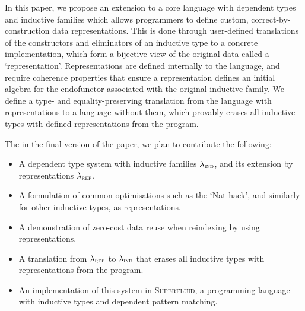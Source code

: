 In this paper, we propose an extension to a core language with dependent types
and inductive families which allows programmers to define custom,
correct-by-construction data representations. This is done
through user-defined translations of the constructors and eliminators of an
inductive type to a concrete implementation, which form a bijective view of the
original data called a `representation'. Representations are defined internally
to the language, and require coherence properties that ensure a representation
defines an initial algebra for the endofunctor associated with the original
inductive family. We define a type- and equality-preserving translation from the
language with representations to a language without them, which provably erases
all inductive types with defined representations from the program.

The in the final version of the paper, we plan to contribute the following:
\begin{itemize}
  \item A dependent type system with inductive families $\lambda_{\textsc{ind}}$,
    and its extension by representations $\lambda_{\textsc{rep}}$.
  \item A formulation of common optimisations such as the `Nat-hack', and
      similarly for other inductive types, as representations.
  \item A demonstration of zero-cost data reuse when reindexing by using representations.
  \item A translation from $\lambda_{\textsc{rep}}$ to $\lambda_{\textsc{ind}}$ that erases all
    inductive types with representations from the program.
  \item An implementation of this system in \textsc{Superfluid}, a programming
    language with inductive types and dependent pattern matching.
\end{itemize}


